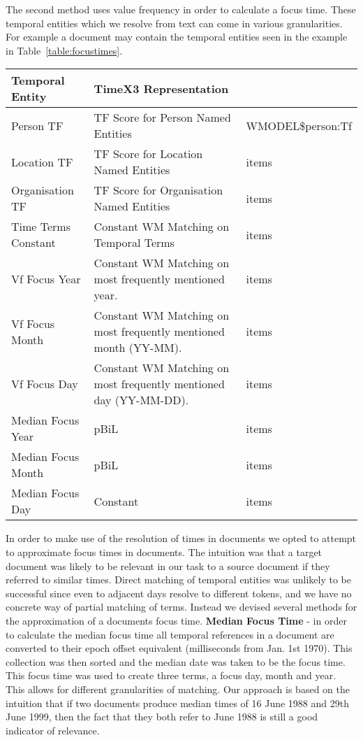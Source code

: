 \documentclass{mpaper}
\begin{document}
The second method uses value frequency in order to calculate a focus time. These temporal entities which we resolve from text can come in various granularities. For example a document may contain the temporal entities seen in the example in Table~\ref{table:focustimes}.

\begin{table*}[t] \label{table:focustimes}
\centering
\begin{tabular}{|p{4cm}|p{6cm}|p{4cm}|}
\hline
Temporal Entity 	& TimeX3 Representation  \\ \hline
Person TF 			& TF Score for Person Named Entities 		& WMODEL\$person:Tf  \\ \hline
Location TF 		& TF Score for Location Named Entities 		& items  \\ \hline
Organisation TF 	& TF Score for Organisation Named Entities 		& items  \\ \hline
Time Terms Constant & Constant WM Matching on Temporal Terms			& items  \\ \hline
Vf Focus Year 		& Constant WM Matching on most frequently mentioned year. 		& items  \\ \hline
Vf Focus Month 		& Constant WM Matching on most frequently mentioned month (YY-MM).  		& items  \\ \hline
Vf Focus Day 		& Constant WM Matching on most frequently mentioned day (YY-MM-DD).  		& items  \\ \hline
Median Focus Year 	& pBiL 		& items  \\ \hline
Median Focus Month 	& pBiL 		& items  \\ \hline
Median Focus Day 	& Constant 		& items  \\ \hline
\end{tabular}
\end{table*}

In order to make use of the resolution of times in documents we opted to attempt to approximate focus times in documents. The intuition was that a target document was likely to be relevant in our task to a source document if they referred to similar times.
Direct matching of temporal entities was unlikely to be successful since even to adjacent days resolve to different tokens, and we have no concrete way of partial matching of terms.
Instead we devised several methods for the approximation of a documents focus time.
\textbf{Median Focus Time} - in order to calculate the median focus time all temporal references in a document are converted to their epoch offset equivalent (milliseconds from Jan. 1st 1970).
This collection was then sorted and the median date was taken to be the focus time.
This focus time was used to create three terms, a focus day, month and year. This allows for different granularities of matching.
Our approach is based on the intuition that if two documents produce median times of 16 June 1988 and 29th June 1999, then the fact that they both refer to June 1988 is still a good indicator of relevance.
\end{document}
